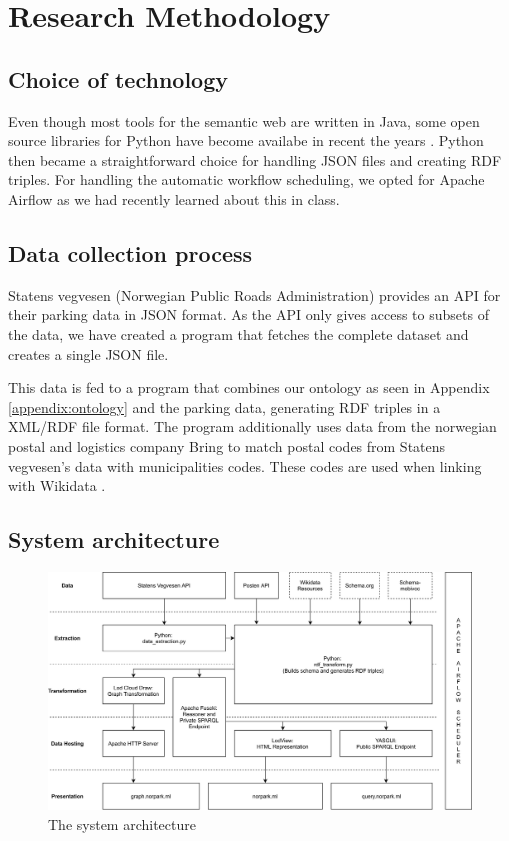 \chapter{Research Methodology}

\section{Choice of technology}
Even though most tools for the semantic web are written in Java, some open source libraries for Python have become availabe in recent the years \cite{w3java}. Python then became a straightforward choice for handling JSON files and creating RDF triples. For handling the automatic workflow scheduling, we opted for Apache Airflow as we had recently learned about this in class.


\section{Data collection process}
Statens vegvesen (Norwegian Public Roads Administration) \cite{statensvegvesen} provides an API for their parking data in JSON format. As the API only gives access to subsets of the data, we have created a program that fetches the complete dataset and creates a single JSON file.

This data is fed to a program that combines our ontology as seen in Appendix \ref{appendix:ontology} and the parking data, generating RDF triples in a XML/RDF file format. The program additionally uses data from the norwegian postal and logistics company Bring \cite{bring} to match postal codes from Statens vegvesen's data with municipalities codes. These codes are used when linking with Wikidata \cite{wikidata}.


\section{System architecture}

\begin{figure}[H]
	\centering
	\includegraphics[width=\linewidth]{figures/system-architecture.png}
	\caption{The system architecture}
\end{figure}



